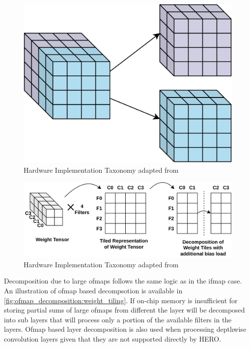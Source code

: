 \begin{figure}[ht]
    \centering
    \includegraphics[scale=0.25]{fig/ifmap_decomposition.pdf}
    \caption{Hardware Implementation Taxonomy adapted from \cite{maestro}}
    \label{fig:ifmap_decomposition}
\end{figure}


\begin{figure}[ht]
    \centering
    \includegraphics[scale=0.4]{fig/ifmap_decomposition_tiling_repr.pdf}
    \caption{Hardware Implementation Taxonomy adapted from \cite{maestro}}
    \label{fig:ifmap_decomposition:weight_tiling}
\end{figure}

Decomposition due to large ofmaps follows the same logic as in the ifmap case.
An illustration of ofmap based decompsotion is available in
\autoref{fig:ofmap_decomposition:weight_tiling}. If on-chip memory is
insufficient for storing partial sums of large ofmaps from different the layer will be
decomposed into sub layers that will process only a portion of the available
filters in the layers. Ofmap based layer decomposition is also used when
processing depthwise convolution layers given that they are not supported
directly by HERO.  

